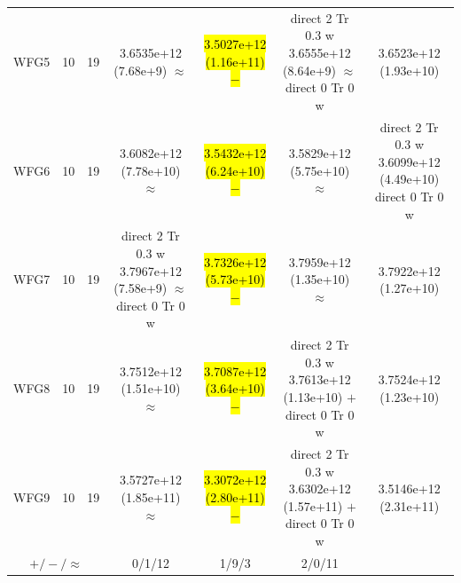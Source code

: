 \documentclass[conference]{IEEEtran}
\newcommand{\semitextbf}[1]{%
	\pdfliteral direct {2 Tr 0.3 w} %
	#1%
	\pdfliteral direct {0 Tr 0 w}%
}
\begin{document}
\begin{table}[!t]
\begin{tabular}{ccccccc}
    \multirow{1}{*}{WFG5}&10&19&3.6535e+12 (7.68e+9) $\approx$&\hl{3.5027e+12 (1.16e+11) $-$}&\semitextbf{3.6555e+12 (8.64e+9) $\approx$}&3.6523e+12 (1.93e+10)\\
    \multirow{1}{*}{WFG6}&10&19&3.6082e+12 (7.78e+10) $\approx$&\hl{3.5432e+12 (6.24e+10) $-$}&3.5829e+12 (5.75e+10) $\approx$&\semitextbf{3.6099e+12 (4.49e+10)}\\
    \multirow{1}{*}{WFG7}&10&19&\semitextbf{3.7967e+12 (7.58e+9) $\approx$}&\hl{3.7326e+12 (5.73e+10) $-$}&3.7959e+12 (1.35e+10) $\approx$&3.7922e+12 (1.27e+10)\\
    \multirow{1}{*}{WFG8}&10&19&3.7512e+12 (1.51e+10) $\approx$&\hl{3.7087e+12 (3.64e+10) $-$}&\semitextbf{3.7613e+12 (1.13e+10) $+$}&3.7524e+12 (1.23e+10)\\
    \multirow{1}{*}{WFG9}&10&19&3.5727e+12 (1.85e+11) $\approx$&\hl{3.3072e+12 (2.80e+11) $-$}&\semitextbf{3.6302e+12 (1.57e+11) $+$}&3.5146e+12 (2.31e+11)\\
    \midrule
    \multicolumn{3}{c}{$+/-/\approx$}&0/1/12&1/9/3&2/0/11&\\
    \bottomrule
    \end{tabular}
\end{table}
\end{document}
